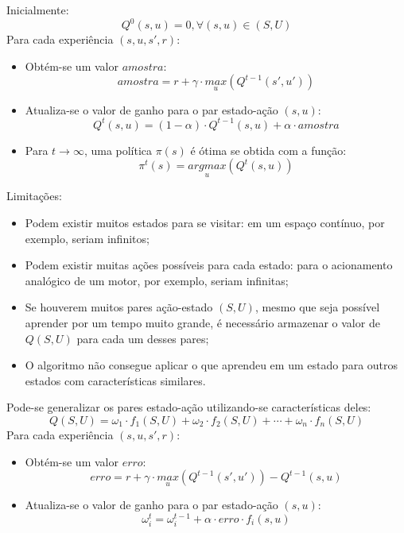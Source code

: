 \documentclass{beamer}
\begin{document}
\begin{frame}
Inicialmente:
$$ Q^0 \left( s, u \right) = 0 , \forall \left( s, u \right) \in \left( S, U \right) $$\pause
Para cada experiência $ \left( s, u, s', r \right) $:\pause
\begin{itemize}
	\item Obtém-se um valor $ amostra $:
		$$ amostra = r + \gamma \cdot \underset{u}{max} \left( Q^{t-1} \left( s', u' \right) \right) $$\pause
	\item Atualiza-se o valor de ganho para o par estado-ação $ \left( s, u \right) $:
		$$ Q^t \left( s, u \right) = \left( 1 - \alpha \right) \cdot Q^{t-1} \left( s, u \right) + \alpha \cdot amostra $$\pause
	\item Para $ t \rightarrow \infty $, uma política $ \pi \left( s \right) $ é ótima se obtida com a função:
		$$ \pi^t \left( s \right) = \underset{u}{argmax} \left( Q^t \left( s, u \right) \right) $$
\end{itemize}
\end{frame}


\begin{frame}
Limitações:\pause
\begin{itemize}
	\item Podem existir muitos estados para se visitar: em um espaço contínuo, por exemplo, seriam infinitos;\pause
	\item Podem existir muitas ações possíveis para cada estado: para o acionamento analógico de um motor, por exemplo, seriam infinitas;\pause
	\item Se houverem muitos pares ação-estado $ \left( S, U \right) $, mesmo que seja possível aprender por um tempo muito grande, é necessário armazenar o valor de $ Q \left( S, U \right) $ para cada um desses pares;\pause
	\item O algoritmo não consegue aplicar o que aprendeu em um estado para outros estados com características similares.
\end{itemize}
\end{frame}


\begin{frame}
Pode-se generalizar os pares estado-ação utilizando-se características deles:
$$ Q \left( S, U \right) = \omega_1 \cdot f_1 \left( S, U \right) + \omega_2 \cdot f_2 \left( S, U \right) + \cdots + \omega_n \cdot f_n \left( S, U \right) $$\pause
Para cada experiência $ \left( s, u, s', r \right) $:\pause
\begin{itemize}
	\item Obtém-se um valor $ erro $:
		$$ erro = r + \gamma \cdot \underset{u}{max} \left( Q^{t-1} \left( s', u' \right) \right) - Q^{t-1} \left( s, u \right) $$\pause
	\item Atualiza-se o valor de ganho para o par estado-ação $ \left( s, u \right) $:
		$$ \omega_i^t = \omega_i^{t-1} + \alpha \cdot erro \cdot f_i \left( s, u \right) $$
\end{itemize}
\end{frame}
\end{document}
